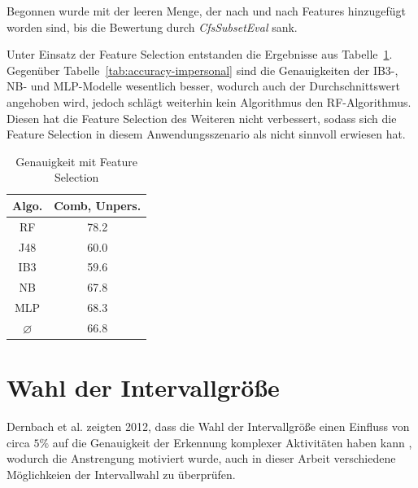Begonnen wurde mit der leeren Menge, der nach und nach Features hinzugefügt worden sind, bis die Bewertung durch \textit{CfsSubsetEval} sank.

Unter Einsatz der Feature Selection entstanden die Ergebnisse aus Tabelle~\ref{tab:accuracy-feature-selection}. Gegenüber Tabelle~\ref{tab:accuracy-impersonal} sind die Genauigkeiten der IB3-, NB- und MLP-Modelle wesentlich besser, wodurch auch der Durchschnittswert angehoben wird, jedoch schlägt weiterhin kein Algorithmus den RF-Algorithmus. Diesen hat die Feature Selection des Weiteren nicht verbessert, sodass sich die Feature Selection in diesem Anwendungsszenario als nicht sinnvoll erwiesen hat.

\begin{table}
\centering
\begin{tabular}{|c|c|}
	\hline 
	\textbf{Algo.} & \textbf{Comb, Unpers.} \\ 
	\hline 
	RF & 78.2 \\ 
	J48 & 60.0 \\ 
	IB3 & 59.6 \\ 
	NB & 67.8 \\ 
	MLP & 68.3 \\ 
	\hline 
	$\varnothing$ & 66.8 \\ 
	\hline 
\end{tabular}
\caption{Genauigkeit mit Feature Selection}
\label{tab:accuracy-feature-selection}
\end{table}

\section{Wahl der Intervallgröße}
Dernbach et al. zeigten 2012, dass die Wahl der Intervallgröße einen Einfluss von circa $5 \%$ auf die Genauigkeit der Erkennung komplexer Aktivitäten haben kann \cite{Dernbach2012}, wodurch die Anstrengung motiviert wurde, auch in dieser Arbeit verschiedene Möglichkeien der Intervallwahl zu überprüfen. 


